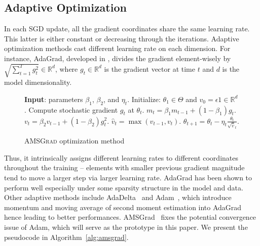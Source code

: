 \documentclass[11pt]{article}
\begin{document}
\vspace{-0.05in}
\subsection{Adaptive Optimization}
\vspace{-0.05in}

In each SGD update, all the gradient coordinates share the same learning rate.
This latter is either constant or decreasing through the iterations. 
Adaptive optimization methods cast different learning rate on each dimension. 
For instance, AdaGrad, developed in \cite{Duchi10-adagrad}, divides the gradient element-wisely by $\sqrt{\sum_{t=1}^T g_{t}^2}\in \mathbb R^d$, where $g_{t}\in \mathbb R^d$ is the gradient vector at time $t$ and $d$ is the model dimensionality. 
\begin{figure}\vspace{-0.8cm}
\begin{minipage}{\linewidth}
\begin{algorithm}[H]
\caption{\textsc{AMSGrad} optimization method} \label{alg:amsgrad}
\begin{algorithmic}[1]
\small
\STATE \textbf{Input}: parameters $\beta_1$, $\beta_2$, and $\eta_t$. 
\STATE Initialize: $\theta_{1} \in \Theta$ and $v_{0} = \epsilon 1 \in \mathbb R^{d}$.
\STATE Compute stochastic gradient $g_t$ at $\theta_t$.
\STATE $m_t = \beta_1 m_{t-1} + (1 - \beta_1) g_t$.
\STATE $v_t = \beta_2 v_{t-1} + (1 - \beta_2) g_t^2$. 
\STATE \label{line:maxop}$\hat{v}_t = \max( \hat{v}_{t-1} , v_t )$. 
\STATE $\theta_{t+1} = \theta_t - \eta_t \frac{\theta_t}{ \sqrt{\hat{v}}_t }$.
\ENDFOR
\end{algorithmic}
\end{algorithm}
\vspace{-0.1in}
\end{minipage}\end{figure}
Thus, it intrinsically assigns different learning rates to different coordinates throughout the training -- elements with smaller previous gradient magnitude tend to move a larger step via larger learning rate. AdaGrad has been shown to perform well especially under some sparsity structure in the model and data. Other adaptive methods include AdaDelta~\cite{Proc:adadelta} and Adam~\cite{kingma2014adam}, which introduce momentum and moving average of second moment estimation into AdaGrad hence leading to better performances. 
AMSGrad~\cite{reddi2019convergence} fixes the potential convergence issue of Adam, which will serve as the prototype in this paper. 
We present the pseudocode in Algorithm~\ref{alg:amsgrad}.
\end{document}
